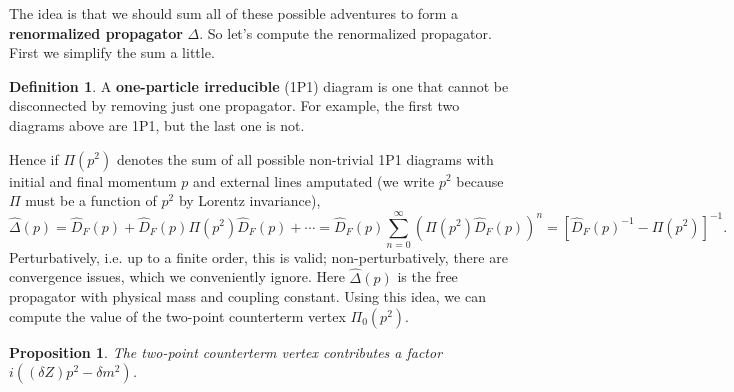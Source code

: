 \documentclass{report}
\theoremstyle{plain}
\newtheorem{proposition}[theorem]{Proposition}
\theoremstyle{definition}
\newtheorem{definition}[theorem]{Definition}
\theoremstyle{remark}
\begin{document}
\begin{center}
\begin{minipage}{0.3\textwidth}
  \end{minipage}
\end{center}
The idea is that we should sum all of these possible adventures to
form a {\bf renormalized propagator} $\Delta$. So let's compute the
renormalized propagator. First we simplify the sum a little.

\begin{definition}
  A {\bf one-particle irreducible} (1P1) diagram is one that cannot be
  disconnected by removing just one propagator. For example, the first
  two diagrams above are 1P1, but the last one is not.
\end{definition}

Hence if $\Pi(p^2)$ denotes the sum of all possible non-trivial 1P1
diagrams with initial and final momentum $p$ and external lines
amputated (we write $p^2$ because $\Pi$ must be a function of $p^2$ by
Lorentz invariance),
$$ \widehat{\Delta}(p) = \widehat{D}_F(p) + \widehat{D}_F(p)\Pi(p^2)\widehat{D}_F(p) + \cdots = \widehat{D}_F(p) \sum_{n=0}^\infty (\Pi(p^2)\widehat{D}_F(p))^n = [\widehat{D}_F(p)^{-1} - \Pi(p^2)]^{-1}. $$
Perturbatively, i.e. up to a finite order, this is valid;
non-perturbatively, there are convergence issues, which we
conveniently ignore. Here $\widehat{\Delta}(p)$ is the free propagator
with physical mass and coupling constant. Using this idea, we can
compute the value of the two-point counterterm vertex $\Pi_0(p^2)$.

\begin{proposition}
  The two-point counterterm vertex contributes a factor
  $i((\delta Z)p^2 - \delta m^2)$.
\end{proposition}
\end{document}
